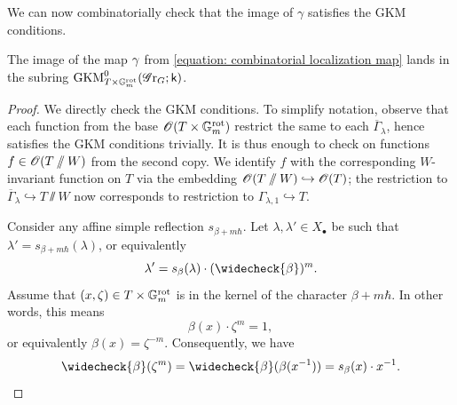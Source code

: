 We can now combinatorially check that the image of $\gamma$ satisfies the GKM conditions.
\begin{lemma}\label{lemma: GKM localization map combinatorial}
The image of the map $\gamma$ from \eqref{equation: combinatorial localization map} lands in the subring $\operatorname{GKM}^{0}_{T \times \mathbb{G}_m^{\mathrm{rot}}}(\operatorname{\mathscr{G}r}_G; \mathsf{k})$.     
\end{lemma}
\begin{proof}
We directly check the GKM conditions. To simplify notation, observe that each function from the base $\operatorname{\mathscr{O}}(T \times \mathbb{G}_m^{\mathrm{rot}})$ restrict the same to each $\overline{\Gamma}_{\lambda}$, hence satisfies the GKM conditions trivially. It is thus enough to check on functions $f \in \operatorname{\mathscr{O}}(T\sslash W)$ from the second copy. We identify $f$ with the corresponding $W$-invariant function on $T$ via the embedding $\operatorname{\mathscr{O}}(T\sslash W) \hookrightarrow \operatorname{\mathscr{O}}(T)$; the restriction to $\overline{\Gamma}_{\lambda} \hookrightarrow T\sslash W$ now corresponds to restriction to $\Gamma_{\lambda, 1} \hookrightarrow T$.

Consider any affine simple reflection $s_{\beta + m\hbar}$. 
Let $\lambda, \lambda' \in X_{\bullet}$ be such that $\lambda' = s_{\beta+ m\hbar} (\lambda)$, or equivalently
\begin{equation}\label{equation: combinatorial verification eq 0}
\lambda' = s_{\beta}(\lambda) \cdot (\widecheck{\beta})^m.   
\end{equation}
Assume that $(x, \zeta) \in T \times \mathbb{G}_m^{\mathrm{rot}}$ is in the kernel of the character $\beta+m\hbar$. In other words, this means 
\begin{equation}\label{equation: combinatorial verification eq 1}
\beta(x) \cdot \zeta^m = 1,  
\end{equation}
or equivalently $\beta(x) = \zeta^{-m}$.
Consequently, we have 
\begin{equation}\label{equation: combinatorial verification eq 2}
\widecheck{\beta}(\zeta^m) = \widecheck{\beta}(\beta(x^{-1})) = s_{\beta}(x) \cdot x^{-1}. 
\end{equation}



\end{proof}
